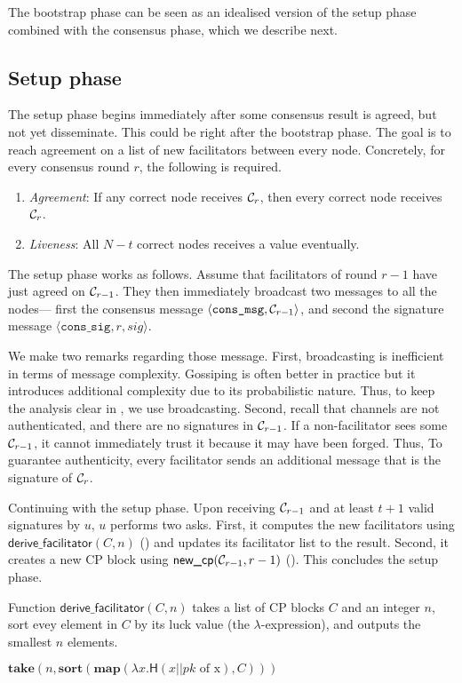 The bootstrap phase can be seen as an idealised version of the setup phase combined with the consensus phase,
which we describe next.

\subsection{Setup phase}
The setup phase begins immediately after some consensus result is agreed, but not yet disseminate.
This could be right after the bootstrap phase.
The goal is to reach agreement on a list of new facilitators between every node.
Concretely, for every consensus round $r$, the following is required.
\begin{enumerate}
\item \emph{Agreement}: If any correct node receives $\mathcal{C}_r$,
  then every correct node receives $\mathcal{C}_r$.
\item \emph{Liveness}: All $N - t$ correct nodes receives a value eventually.
\end{enumerate}

The setup phase works as follows.
Assume that facilitators of round $r-1$ have just agreed on $\mathcal{C}_{r-1}$.
They then immediately broadcast two messages to all the nodes---
first the consensus message $\langle \texttt{cons\_msg}, \mathcal{C}_{r-1} \rangle$,
and second the signature message $\langle \texttt{cons\_sig}, r, sig \rangle$.

We make two remarks regarding those message.
First, broadcasting is inefficient in terms of message  complexity.
Gossiping is often better in practice but it introduces additional complexity due to its probabilistic nature.
Thus, to keep the analysis clear in , we use broadcasting.
Second, recall that channels are not authenticated, 
and there are no signatures in $\mathcal{C}_{r - 1}$.
If a non-facilitator sees some $\mathcal{C}_{r - 1}$, it cannot immediately trust it because it may have been forged.
Thus, To guarantee authenticity, every facilitator sends an additional message that is the signature of $\mathcal{C}_r$.

Continuing with the setup phase.
Upon receiving $\mathcal{C}_{r - 1}$ and at least $t + 1$ valid signatures by $u$, $u$ performs two asks.
First, it computes the new facilitators using $\textsf{derive\_facilitator}(C, n)$ ()
and updates its facilitator list to the result.
Second, it creates a new CP block using $\textsf{new\_cp}(\mathcal{C}_{r - 1}, r - 1)$ ().
This concludes the setup phase.

\begin{algorithm}
\caption{Function $\textsf{derive\_facilitator}(C, n)$ takes a list of CP blocks $C$ and an integer $n$,
sort evey element in $C$ by its luck value (the $\lambda$-expression), and outputs the smallest $n$ elements.}
\label{alg:facilitator}
\begin{algorithmic}
\State $\textbf{take} (n, \textbf{sort} (\textbf{map}(\lambda x.\textsf{H}(x || pk \text{ of x}), C)))$
\end{algorithmic}
\end{algorithm}

